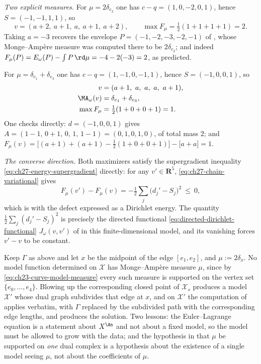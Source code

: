 \begin{example}
\emph{Two explicit measures.}
For \(\mu=2\delta_{e_2}\) one has \(c-q=(1,0,-2,0,1)\), hence
\(S=(-1,-1,1,1)\), so
\[
 v=(a+2,\ a+1,\ a,\ a+1,\ a+2),
 \qquad
 \max F_\mu=\tfrac12(1+1+1+1)=2 .
\]
Taking \(a=-3\) recovers the envelope
\(P=(-1,-2,-3,-2,-1)\) of , whose
Monge--Amp\`ere measure was computed there to be \(2\delta_{e_2}\); and
indeed \(F_\mu(P)=E_\omega(P)-\int P\,\rd\mu=-4-2(-3)=2\), as predicted.

For \(\mu=\delta_{e_1}+\delta_{e_3}\) one has \(c-q=(1,-1,0,-1,1)\), hence
\(S=(-1,0,0,1)\), so
\[
 \begin{aligned}
 v&=(a+1,\ a,\ a,\ a,\ a+1),\\
 \MA_\omega(v)&=\delta_{e_1}+\delta_{e_3},\\
 \max F_\mu&=\tfrac12(1+0+0+1)=1 .
 \end{aligned}
\]
One checks directly: \(d=(-1,0,0,1)\) gives
\(A=(1-1,\,0+1,\,0,\,1,\,1-1)=(0,1,0,1,0)\), of total mass \(2\); and
\(F_\mu(v)=\bigl[(a+1)+(a+1)-\tfrac12(1+0+0+1)\bigr]-\bigl[a+a\bigr]=1\).

\emph{The converse direction.}  Both maximizers satisfy the supergradient
inequality \eqref{eq:ch27-energy-supergradient} directly: for any
\(v'\in\mathbf R^5\), \eqref{eq:ch27-chain-variational} gives
\[
 F_\mu(v')-F_\mu(v)
 =-\tfrac12\sum_{j}\bigl(d_j'-S_j\bigr)^2\ \leq\ 0,
\]
which is  with the defect
expressed as a Dirichlet energy.  The quantity
\(\tfrac12\sum_j(d_j'-S_j)^2\) is precisely the directed functional
\eqref{eq:directed-dirichlet-functional}
\(J_\omega(v,v')\) of  in this
finite-dimensional model, and its vanishing forces \(v'-v\) to be constant.
\end{example}

\begin{example}
\label{ex:ch27-measure-off-vertices}
Keep \(\Gamma\) as above and let \(x\) be the midpoint of the edge
\([e_1,e_2]\), and \(\mu:=2\delta_x\).  No model function determined on
\(\mathcal X\) has Monge--Amp\`ere measure \(\mu\), since by
\eqref{eq:ch23-curve-model-measure} every such measure is supported on the
vertex set \(\{e_0,\dots,e_4\}\).  Blowing up the corresponding closed point
of \(\mathcal X_s\) produces a model \(\mathcal X'\) whose dual graph
subdivides that edge at \(x\), and on \(\mathcal X'\) the computation of
 applies verbatim, with \(\Gamma\)
replaced by the subdivided path with the corresponding edge lengths, and
produces the solution.  Two lessons: the Euler--Lagrange equation is a
statement about \(X^{\An}\) and not about a fixed model, so the model must
be allowed to grow with the data; and the hypothesis in
 that \(\mu\) be supported on \emph{one} dual
complex is a hypothesis about the existence of a single model seeing
\(\mu\), not about the coefficients of \(\mu\).
\end{example}

